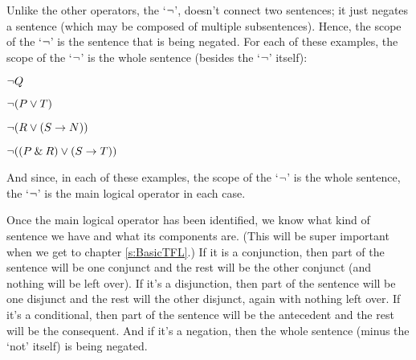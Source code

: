 Unlike the other operators, the `${\neg}$', doesn't connect two sentences; it just negates a sentence (which may be composed of multiple subsentences). Hence, the scope of the `${\neg}$' is the sentence that is being negated. For each of these examples, the scope of the `${\neg}$' is the whole sentence (besides the `${\neg}$' itself): 

\begin{earg}
\item[] ${\neg} Q$
\item[] ${\neg}(P \vee T)$
\item[] ${\neg}(R \vee (S \rightarrow N))$
\item[] ${\neg}((P \mathbin{\&} R) \vee (S \rightarrow T))$
\end{earg}
And since, in each of these examples, the scope of the `${\neg}$' is the whole sentence, the `${\neg}$' is the main logical operator in each case.


Once the main logical operator has been identified, we know what kind of sentence we have and what its components are. (This will be super important when we get to chapter \ref{s:BasicTFL}.)
If it is a conjunction, then part of the sentence will be one conjunct and the rest will be the other conjunct (and nothing will be left over). If it's a disjunction, then part of the sentence will be one disjunct and the rest will the other disjunct, again with nothing left over. If it's a conditional, then part of the sentence will be the antecedent and the rest will be the consequent. And if it's a negation, then the whole sentence (minus the `not' itself) is being negated.




